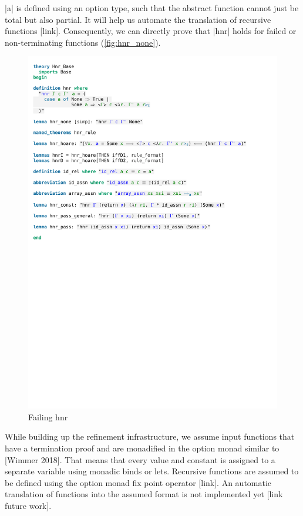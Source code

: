 \noindent |a| is defined using an option type, such that the abstract function cannot just be total but also partial. It will help us automate the translation of recursive functions [link].
Consequently, we can directly prove that |hnr| holds for failed or non-terminating functions (\autoref{fig:hnr_none}).

\begin{figure}[htpb]
    \includegraphics[trim={0 23,8cm 0 5,2cm}, clip, width=1.00\textwidth]{figures/Theory_Hnr_Base.pdf}
    \caption[Failing hnr]{Failing hnr}
    \label{fig:hnr_none}
\end{figure}

\noindent While building up the refinement infrastructure, we assume input functions that have a termination proof and are monadified in the option monad similar to [Wimmer 2018]. That means that every value and constant is assigned to a separate variable using monadic binds or lets. Recursive functions are assumed to be defined using the option monad fix point operator [link]. An automatic translation of functions into the assumed format is not implemented yet [link future work].

